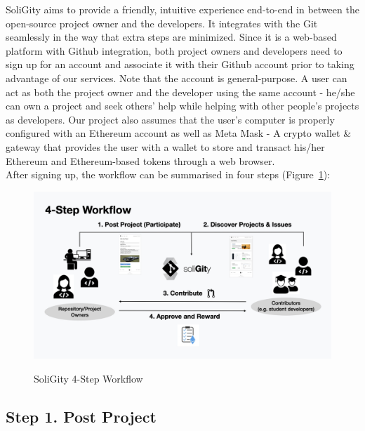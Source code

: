 \documentclass[12pt]{article}
\renewcommand{\_}{\kern-1.5pt\textunderscore\kern-1.5pt}
\begin{document}
SoliGity aims to provide a friendly, intuitive experience end-to-end in between the open-source project owner and the developers. It integrates with the Git seamlessly in the way that extra steps are minimized. Since it is a web-based platform with Github integration, both project owners and developers need to sign up for an account and associate it with their Github account prior to taking advantage of our services. Note that the account is general-purpose. A user can act as both the project owner and the developer using the same account - he/she can own a project and seek others’ help while helping with other people’s projects as developers. Our project also assumes that the user’s computer is properly configured with an Ethereum account as well as Meta Mask - A crypto wallet \& gateway that provides the user with a wallet to store and transact his/her Ethereum and Ethereum-based tokens through a web browser. \\

\noindent After signing up, the workflow can be summarised in four steps (Figure~\ref{fig:workflow1}):

\begin{figure}[h]
    \centering
    \includegraphics[width=16.5cm]{graphs/00a. workflow.jpeg}\\
    \caption{SoliGity 4-Step Workflow}
    \label{fig:workflow1}
\end{figure}


\subsection*{Step 1. Post Project}
\end{document}
